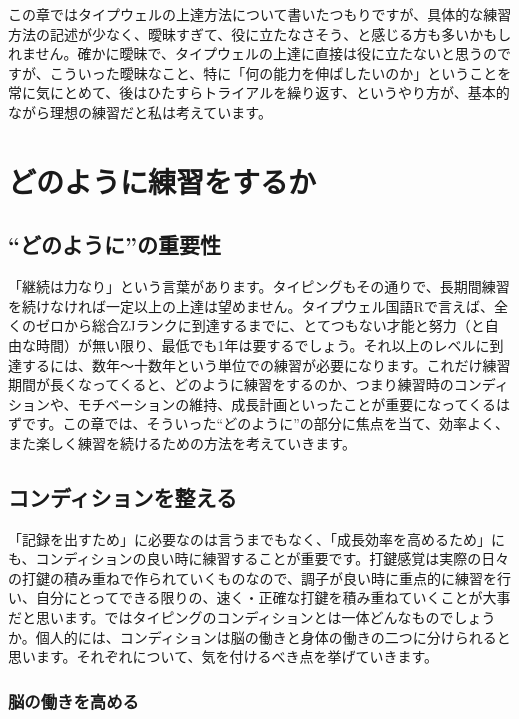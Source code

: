 この章ではタイプウェルの上達方法について書いたつもりですが、具体的な練習方法の記述が少なく、曖昧すぎて、役に立たなさそう、と感じる方も多いかもしれません。確かに曖昧で、タイプウェルの上達に直接は役に立たないと思うのですが、こういった曖昧なこと、特に「何の能力を伸ばしたいのか」ということを常に気にとめて、後はひたすらトライアルを繰り返す、というやり方が、基本的ながら理想の練習だと私は考えています。

\section{どのように練習をするか}

\subsection{“どのように”の重要性}

「継続は力なり」という言葉があります。タイピングもその通りで、長期間練習を続けなければ一定以上の上達は望めません。タイプウェル国語Rで言えば、全くのゼロから総合ZJランクに到達するまでに、とてつもない才能と努力（と自由な時間）が無い限り、最低でも1年は要するでしょう。それ以上のレベルに到達するには、数年～十数年という単位での練習が必要になります。これだけ練習期間が長くなってくると、どのように練習をするのか、つまり練習時のコンディションや、モチベーションの維持、成長計画といったことが重要になってくるはずです。この章では、そういった“どのように”の部分に焦点を当て、効率よく、また楽しく練習を続けるための方法を考えていきます。

\subsection{コンディションを整える}

「記録を出すため」に必要なのは言うまでもなく、「成長効率を高めるため」にも、コンディションの良い時に練習することが重要です。打鍵感覚は実際の日々の打鍵の積み重ねで作られていくものなので、調子が良い時に重点的に練習を行い、自分にとってできる限りの、速く・正確な打鍵を積み重ねていくことが大事だと思います。ではタイピングのコンディションとは一体どんなものでしょうか。個人的には、コンディションは脳の働きと身体の働きの二つに分けられると思います。それぞれについて、気を付けるべき点を挙げていきます。

\subsubsection*{脳の働きを高める}

